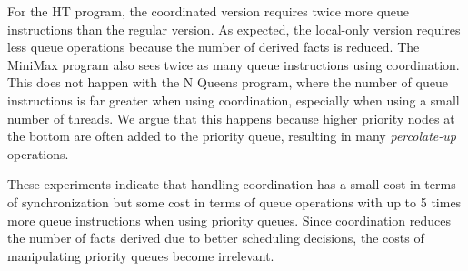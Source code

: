 For the HT program, the coordinated version requires twice more queue
instructions than the regular version. As expected, the local-only version
requires less queue operations because the number of derived facts is reduced.
The MiniMax program also sees twice as many queue instructions using
coordination. This does not happen with the N Queens program, where the number
of queue instructions is far greater when using coordination, especially when
using a small number of threads. We argue that this happens because higher
priority nodes at the bottom are often added to the priority queue, resulting in
many \emph{percolate-up} operations.

These experiments indicate that handling coordination has a small cost in terms
of synchronization but some cost in terms of queue operations with
up to 5 times more queue instructions when using priority queues.
Since coordination reduces the number of facts derived due to better scheduling
decisions, the costs of manipulating priority queues become irrelevant.
\fi
